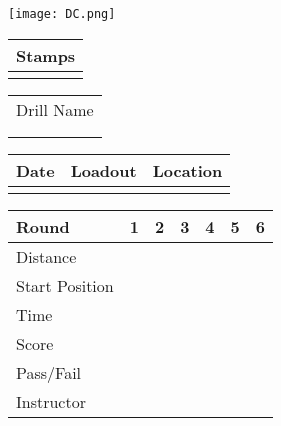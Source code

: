 \documentclass[../Cover.tex]{subfiles}
\begin{document}
\begin{minipage}[t]{0.15\textwidth} 
	\texttt{[image: DC.png]}
	\begin{tabular}{p{}|}
		Stamps \\
		\hline
		\\[5.5cm]
	\end{tabular}
\end{minipage}
\hfill
\begin{minipage}[t]{0.85\textwidth}

	\begin{minipage}[t]{3cm}
		\begin{tabular}{ p{3cm} }			
			\large Drill Name\\[0.5cm]
			\\
			\hline
			\\	
		\end{tabular}
	\end{minipage}
	\hfill
	\begin{minipage}[t]{0.3\textwidth}
		\begin{tabular}{ | p{1.5cm} | p{1.5cm} | p{1.5cm} |}
			\hline
			Date & Loadout & Location\\ 
			\hline
			&  &  \\ 
			\hline
		\end{tabular}
	\end{minipage}
	\begin{tabular}{ | p{1.5cm} | p{1cm} | p{.5cm} | p{.5cm} | p{.5cm} | p{.5cm} | p{.5cm} |}
		\hline
		Round & 1 & 2 & 3 & 4 & 5 & 6 \\ 
		\hline
		\tiny Distance & & & & & & \\ 		
		\hline
		\tiny Start Position & & & & & & \\
		\hline
		\tiny Time & & & & & & \\
		\hline
		\tiny Score & & & & & & \\
		\hline
		\tiny Pass/Fail & & & & & & \\
		\hline
		\tiny Instructor & & & & & & \\
		\hline
	\end{tabular}
\end{minipage}
\end{document}
